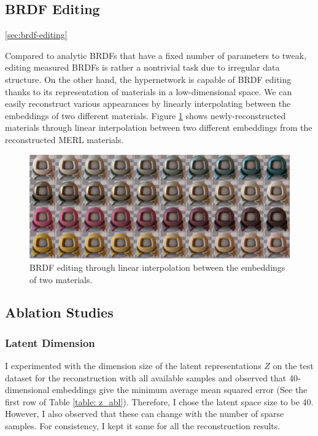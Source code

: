 \subsection{BRDF Editing}\ref{sec:brdf-editing}

Compared to analytic BRDFs that have a fixed number of parameters to tweak, editing measured BRDFs is rather a nontrivial task due to irregular data structure. On the other hand, the hypernetwork is capable of BRDF editing thanks to its representation of materials in a low-dimensional space. We can easily reconstruct various appearances by linearly interpolating between the embeddings of two different materials. Figure \ref{fig:interpolation} shows newly-reconstructed materials through linear interpolation between two different embeddings from the reconstructed MERL materials. 


\begin{figure}[ht]
  \centering
   \includegraphics[width=0.9\linewidth]{Chapters/hyperbrdf-figs/interpolation_extended.pdf}

   \caption{BRDF editing through linear interpolation between the embeddings of two materials.}
   \label{fig:interpolation}
\end{figure}

\subsection{Ablation Studies}\label{sec:abl}
\subsubsection{Latent Dimension}
I experimented with the dimension size of the latent representations $Z$ on the test dataset for the reconstruction with all available samples and observed that 40-dimensional embeddings give the minimum average mean squared error (See the first row of Table \ref{table: z_abl}). Therefore, I chose the latent space size to be 40. However, I also observed that these can change with the number of sparse samples. For consistency, I kept it same for all the reconstruction results. 

